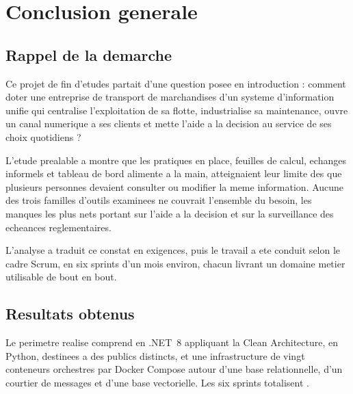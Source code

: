 \cleardoublepage
{}
{}
\chapter*{Conclusion generale}

\section*{Rappel de la demarche}

Ce projet de fin d'etudes partait d'une question posee en introduction :
comment doter une entreprise de transport de marchandises d'un systeme
d'information unifie qui centralise l'exploitation de sa flotte,
industrialise sa maintenance, ouvre un canal numerique a ses clients et
mette l'aide a la decision au service de ses choix quotidiens ?

L'etude prealable a montre que les pratiques en place, feuilles de
calcul, echanges informels et tableau de bord alimente a la main,
atteignaient leur limite des que plusieurs personnes devaient consulter
ou modifier la meme information. Aucune des trois familles d'outils
examinees ne couvrait l'ensemble du besoin, les manques les plus nets
portant sur l'aide a la decision et sur la surveillance des echeances
reglementaires.

L'analyse a traduit ce constat en exigences, puis le travail a ete
conduit selon le cadre Scrum, en six sprints d'un mois environ, chacun
livrant un domaine metier utilisable de bout en bout.

\section*{Resultats obtenus}

Le perimetre realise comprend  en .NET~8
appliquant la Clean Architecture,  en Python,  destinees a des
publics distincts, et une infrastructure de vingt conteneurs orchestres
par Docker Compose autour d'une base relationnelle, d'un courtier de
messages et d'une base vectorielle. Les six sprints totalisent
.

